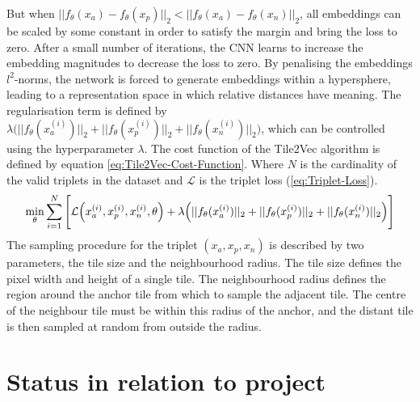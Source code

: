 \newline
\newline
But when $||f_\theta(x_a) - f_\theta(x_p)||_2 < ||f_\theta(x_a) - f_\theta(x_n)||_2$, all embeddings can be scaled by some constant in order to satisfy the margin and bring the loss to zero. After a small number of iterations, the \gls{CNN} learns to increase the embedding magnitudes to decrease the loss to zero. By penalising the embeddings $l^2$-norms, the network is forced to generate embeddings within a hypersphere, leading to a representation space in which relative distances have meaning. The regularisation term is defined by $\lambda \Big(||f_\theta(x_a^{(i)})||_2 + ||f_\theta(x_p^{(i)})||_2 + ||f_\theta(x_n^{(i)})||_2\Big)$, which can be controlled using the hyperparameter $\lambda$. The cost function of the Tile2Vec algorithm is defined by equation \ref{eq:Tile2Vec-Cost-Function}. Where $N$ is the cardinality of the valid triplets in the dataset and $\mathcal{L}$ is the triplet loss (\ref{eq:Triplet-Loss}).
\begin{equation}
    \centering
    \min_\theta \sum_{i=1}^N \Bigg[\mathcal{L}\Big(x_a^{(i)}, x_p^{(i)}, x_n^{(i)}, \theta\Big) + \lambda \Big(||f_\theta(x_a^{(i)})||_2 + ||f_\theta(x_p^{(i)})||_2 + ||f_\theta(x_n^{(i)})||_2\Big)\Bigg]
    \label{eq:Tile2Vec-Cost-Function}
\end{equation}
The sampling procedure for the triplet $(x_a, x_p, x_n)$ is described by two parameters, the tile size and the neighbourhood radius. The tile size defines the pixel width and height of a single tile. The neighbourhood radius defines the region around the anchor tile from which to sample the adjacent tile. The centre of the neighbour tile must be within this radius of the anchor, and the distant tile is then sampled at random from outside the radius.

\section{Status in relation to project}
\label{sec:Status-Relation-Project}

